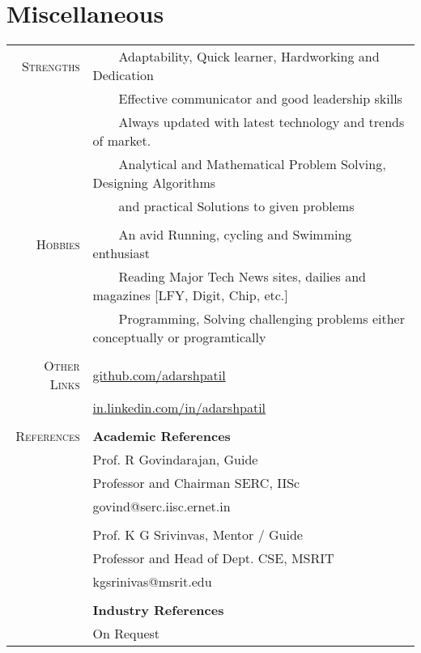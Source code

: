 \documentclass[a4paper,10pt]{article} %
\newcommand{\tabitem}{~~\llap{\textbullet}~~}
\begin{document}


\section{Miscellaneous}
\begin{tabular}{rl}
\textsc{Strengths} & \tabitem Adaptability, Quick learner, Hardworking and Dedication\\
& \tabitem Effective communicator and good leadership skills \\
& \tabitem Always updated with latest technology and trends of market.\\
& \tabitem Analytical and Mathematical Problem Solving, Designing Algorithms \\
& ~~~~and practical Solutions to given problems \\
& \\
\textsc{Hobbies} & \tabitem An avid Running, cycling and Swimming enthusiast\\
& \tabitem Reading Major Tech News sites, dailies and magazines [LFY, Digit, Chip, etc.] \\
& \tabitem Programming, Solving challenging problems either conceptually or programtically \\
& \\
\textsc{Other Links} & \href{https://github.com/adarshpatil}{github.com/adarshpatil} \\
& \href{http://in.linkedin.com/in/adarshpatil}{in.linkedin.com/in/adarshpatil}\\
&\\
\textsc{References} & \textbf{Academic References} \\
& Prof. R Govindarajan, Guide \\
& Professor and Chairman SERC, IISc\\
& govind@serc.iisc.ernet.in \\
&\\
& Prof. K G Srivinvas, Mentor / Guide  \\
& Professor and Head of Dept. CSE, MSRIT \\
& kgsrinivas@msrit.edu \\
&\\

& \textbf{Industry References} \\
& On Request \\
\end{tabular}
\end{document}
